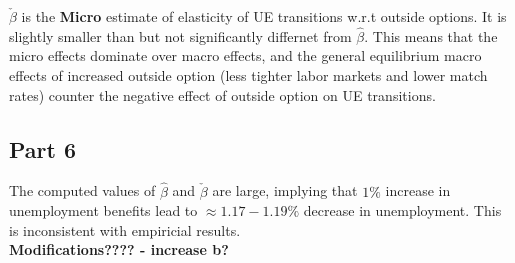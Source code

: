 $\check \beta $ is the \textbf{Micro} estimate of elasticity of UE transitions w.r.t outside options. It is slightly smaller than but not significantly differnet from $\hat \beta$. This means that the micro effects dominate over macro effects, and the general equilibrium macro effects of increased outside option (less tighter labor markets and lower match rates) counter the negative effect of outside option on UE transitions.

\subsection*{Part 6}

The computed values of $\hat \beta$ and $\check \beta$ are large, implying that $1\%$ increase in unemployment benefits lead to $\approx 1.17 - 1.19 \%$ decrease in unemployment. This is inconsistent with empiricial results.\\

\textbf{Modifications???? - increase b?}